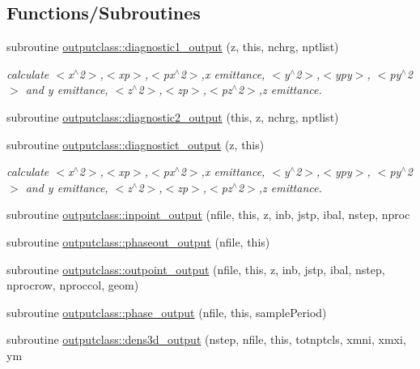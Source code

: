\subsection*{Functions/\+Subroutines}
\begin{DoxyCompactItemize}
\item 
subroutine \mbox{\hyperlink{namespaceoutputclass_aa94732fb01ea05e3a65d2cb9aa5a0402}{outputclass\+::diagnostic1\+\_\+output}} (z, this, nchrg, nptlist)
\begin{DoxyCompactList}\small\item\em calculate $<$x$^\wedge$2$>$,$<$xp$>$,$<$px$^\wedge$2$>$,x emittance, $<$y$^\wedge$2$>$,$<$ypy$>$, $<$py$^\wedge$2$>$ and y emittance, $<$z$^\wedge$2$>$,$<$zp$>$,$<$pz$^\wedge$2$>$,z emittance. \end{DoxyCompactList}\item 
subroutine \mbox{\hyperlink{namespaceoutputclass_a678b3c4ce8356d742c32eb555ee16f08}{outputclass\+::diagnostic2\+\_\+output}} (this, z, nchrg, nptlist)
\item 
subroutine \mbox{\hyperlink{namespaceoutputclass_a4df9d27795de9f5c2d2a8827e2cb7adf}{outputclass\+::diagnostict\+\_\+output}} (z, this)
\begin{DoxyCompactList}\small\item\em calculate $<$x$^\wedge$2$>$,$<$xp$>$,$<$px$^\wedge$2$>$,x emittance, $<$y$^\wedge$2$>$,$<$ypy$>$, $<$py$^\wedge$2$>$ and y emittance, $<$z$^\wedge$2$>$,$<$zp$>$,$<$pz$^\wedge$2$>$,z emittance. \end{DoxyCompactList}\item 
subroutine \mbox{\hyperlink{namespaceoutputclass_a4ad23aaddd82d8307416875d28e5c512}{outputclass\+::inpoint\+\_\+output}} (nfile, this, z, inb, jstp, ibal, nstep, nproc
\item 
subroutine \mbox{\hyperlink{namespaceoutputclass_a92eb6a8aec3f143754010f6e417e8ac2}{outputclass\+::phaseout\+\_\+output}} (nfile, this)
\item 
subroutine \mbox{\hyperlink{namespaceoutputclass_a15a58393664c8a9ded7a8e259fc511e8}{outputclass\+::outpoint\+\_\+output}} (nfile, this, z, inb, jstp, ibal, nstep, nprocrow, nproccol, geom)
\item 
subroutine \mbox{\hyperlink{namespaceoutputclass_a86742b646a584647da7837ee6fc09c89}{outputclass\+::phase\+\_\+output}} (nfile, this, sample\+Period)
\item 
subroutine \mbox{\hyperlink{namespaceoutputclass_a49102c15c2635cf9b329a9ccb56a8db2}{outputclass\+::dens3d\+\_\+output}} (nstep, nfile, this, totnptcls, xmni, xmxi, ym

\end{DoxyCompactItemize}
